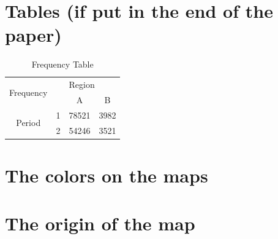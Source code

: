 \pagebreak




\pagebreak
\section*{Tables (if put in the end of the paper)}

\begin{table}[h!]
    \centering
    \begin{tabular}{cccc}
\hline \hline
\multirow{2}{*}{Frequency} &   & \multicolumn{2}{l}{Region}       \\
                           &   & A           & B                  \\
\hline                           
\multirow{2}{*}{Period}    & 1 & 78521          & 3982            \\
                           & 2 & 54246          & 3521            \\
\hline \hline
    \end{tabular}
    \caption{Frequency Table}
    \label{paper1_table_frequency}
\end{table}  



\pagebreak
\begin{subappendices}

\section{The colors on the maps}
\lipsum[10-10]

\section{{The origin of the map}}
\lipsum[11-11]


\end{subappendices}